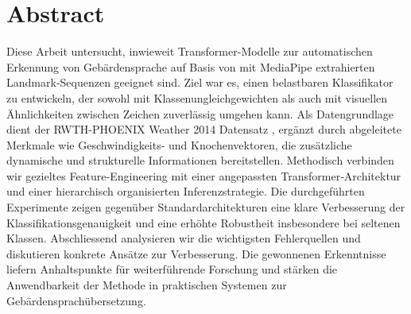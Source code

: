 \chapter*{Abstract}
\label{ch:abstract}

Diese Arbeit untersucht, inwieweit Transformer-Modelle zur automatischen Erkennung von Gebärdensprache auf Basis von mit MediaPipe extrahierten Landmark‑Sequenzen geeignet sind. Ziel war es, einen belastbaren Klassifikator zu entwickeln, der sowohl mit Klassenungleichgewichten als auch mit visuellen Ähnlichkeiten zwischen Zeichen zuverlässig umgehen kann. Als Datengrundlage dient der RWTH-PHOENIX Weather 2014 Datensatz \cite{koller2015phoenix}, ergänzt durch abgeleitete Merkmale wie Geschwindigkeits- und Knochenvektoren, die zusätzliche dynamische und strukturelle Informationen bereitstellen. Methodisch verbinden wir gezieltes Feature‑Engineering mit einer angepassten Transformer‑Architektur und einer hierarchisch organisierten Inferenzstrategie. Die durchgeführten Experimente zeigen gegenüber Standardarchitekturen eine klare Verbesserung der Klassifikationsgenauigkeit und eine erhöhte Robustheit insbesondere bei seltenen Klassen. Abschliessend analysieren wir die wichtigsten Fehlerquellen und diskutieren konkrete Ansätze zur Verbesserung. Die gewonnenen Erkenntnisse liefern Anhaltspunkte für weiterführende Forschung und stärken die Anwendbarkeit der Methode in praktischen Systemen zur Gebärdensprachübersetzung.